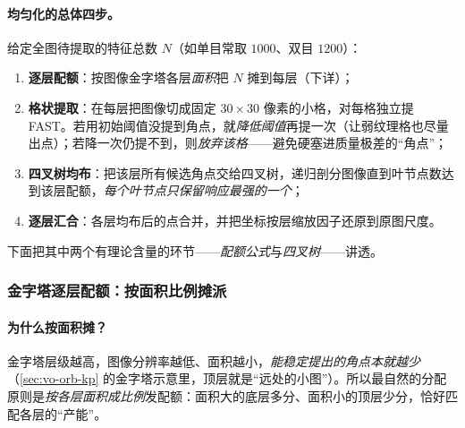 \paragraph{均匀化的总体四步\cite{murartal2017orbslam2}。}给定全图待提取的特征总数 $N$（如单目常取 $1000$、双目 $1200$）：
\begin{enumerate}
  \item \textbf{逐层配额}：按图像金字塔各层\emph{面积}把 $N$ 摊到每层（下详）；
  \item \textbf{格状提取}：在每层把图像切成固定 $30\times30$ 像素的小格，对每格独立提 FAST。若用初始阈值没提到角点，就\emph{降低阈值}再提一次（让弱纹理格也尽量出点）；若降一次仍提不到，则\emph{放弃该格}——避免硬塞进质量极差的“角点”；
  \item \textbf{四叉树均布}：把该层所有候选角点交给四叉树，递归剖分图像直到叶节点数达到该层配额，\emph{每个叶节点只保留响应最强的一个}；
  \item \textbf{逐层汇合}：各层均布后的点合并，并把坐标按层缩放因子还原到原图尺度。
\end{enumerate}
下面把其中两个有理论含量的环节——\emph{配额公式}与\emph{四叉树}——讲透。

\subsubsection*{金字塔逐层配额：按面积比例摊派}
\paragraph{为什么按面积摊？}金字塔层级越高，图像分辨率越低、面积越小，\emph{能稳定提出的角点本就越少}（\cref{sec:vo-orb-kp} 的金字塔示意里，顶层就是“远处的小图”）。所以最自然的分配原则是\emph{按各层面积成比例}发配额：面积大的底层多分、面积小的顶层少分，恰好匹配各层的“产能”。

